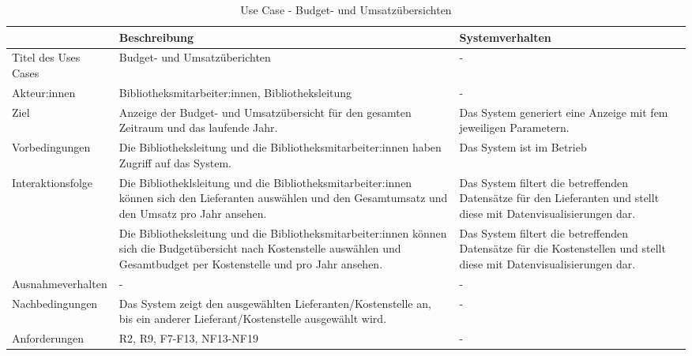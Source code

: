 \begingroup
\setlength{\tabcolsep}{10pt} %
\renewcommand{\arraystretch}{1.25} 
\begin{table}[H]
    \centering
    \begin{adjustbox}{max width=\textwidth}
    \begin{tabular}{lp{6.5cm}p{6.5cm}}
       \toprule
       \textbf{}          & \textbf{Beschreibung} &\textbf{Systemverhalten}\\
       \midrule
        Titel des Uses Cases             &Budget- und Umsatzüberichten  & -\\
        Akteur:innen                     &Bibliotheksmitarbeiter:innen, Bibliotheksleitung & -\\
        Ziel                             &Anzeige der Budget- und Umsatzübersicht für den gesamten Zeitraum und das laufende Jahr. & Das System generiert eine Anzeige mit fem jeweiligen Parametern.\\
        Vorbedingungen                   &Die Bibliotheksleitung und die Bibliotheksmitarbeiter:innen haben Zugriff auf das System.& Das System ist im Betrieb\\
        Interaktionsfolge                &Die Bibliotheklsleitung und die Bibliotheksmitarbeiter:innen  können sich den Lieferanten auswählen und den Gesamtumsatz und den Umsatz pro Jahr ansehen. & Das System filtert die betreffenden Datensätze für den Lieferanten und stellt diese mit Datenvisualisierungen dar.\\
                                        &Die Bibliotheksleitung und die Bibliotheksmitarbeiter:innen können sich die Budgetübersicht nach Kostenstelle auswählen und Gesamtbudget per Kostenstelle und pro Jahr ansehen.& Das System filtert die betreffenden Datensätze für die Kostenstellen  und stellt diese mit Datenvisualisierungen dar.\\
        Ausnahmeverhalten               &- & -\\
        Nachbedingungen                 &Das System zeigt den ausgewählten Lieferanten/Kostenstelle an, bis ein anderer Lieferant/Kostenstelle ausgewählt wird. & -\\

        Anforderungen                   &R2, R9, F7-F13, NF13-NF19& -\\
        \bottomrule
    \end{tabular}
    \end{adjustbox}
    \caption{%
    Use Case - Budget- und Umsatzübersichten
    }
    \label{tab:UC_budget}
    \end{table}
\endgroup

